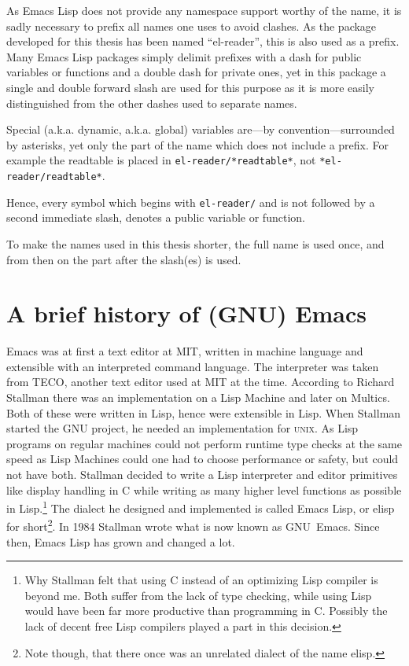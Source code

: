 \documentclass[a4paper,10pt,twoside]{report}
\newcommand{\el}{Emacs Lisp}
\newcommand{\sym}[1]{\texttt{#1}}
\newcommand{\emacs}{GNU~Emacs}
\newcommand{\unix}{\textsc{unix}}
\begin{document}
As \el{} does not provide any namespace support worthy of the name, it is sadly
necessary to prefix all names one uses to avoid clashes.  As the package
developed for this thesis has been named ``el-reader'', this is also used as a
prefix.  Many \el{} packages simply delimit prefixes with a dash for public
variables or functions and a double dash for private ones, yet in this package a
single and double forward slash are used for this purpose as it is more easily
distinguished from the other dashes used to separate names.

Special (a.k.a. dynamic, a.k.a. global) variables are---by
convention---surrounded by asterisks, yet only the part of the name which does
not include a prefix.  For example the readtable is placed in
\sym{el-reader/*readtable*}, not \sym{*el-reader/readtable*}.

Hence, every symbol which begins with \sym{el-reader/} and is not followed by a
second immediate slash, denotes a public variable or function.

To make the names used in this thesis shorter, the full name is used once, and
from then on the part after the slash(es) is used.

\section{A brief history of (GNU) Emacs}
\label{sec:emacs-intro}

Emacs was at first a text editor at MIT, written in machine language and
extensible with an interpreted command language.  The interpreter was taken from
TECO, another text editor used at MIT at the time.  According to Richard
Stallman \cite{emacs-hist} there was an implementation on a Lisp Machine and
later on Multics.  Both of these were written in Lisp, hence were extensible in
Lisp.  When Stallman started the GNU project, he needed an implementation for
\unix{}.  As Lisp programs on regular machines could not perform runtime type
checks at the same speed as Lisp Machines could one had to choose performance or
safety, but could not have both.  Stallman decided to write a Lisp interpreter
and editor primitives like display handling in C while writing as many higher
level functions as possible in Lisp.\footnote{Why Stallman felt that using C
  instead of an optimizing Lisp compiler is beyond me.  Both suffer from the
  lack of type checking, while using Lisp would have been far more productive
  than programming in C.  Possibly the lack of decent free Lisp compilers played
  a part in this decision.}  The dialect he designed and implemented is called
\el{}, or elisp for short\footnote{Note though, that there once was an unrelated
  dialect of the name elisp.}.  In 1984 Stallman wrote what is now known as
\emacs{}\cite[See ``History'']{emacs-first-release}. Since then, \el{} has grown
and changed a lot.
\end{document}
